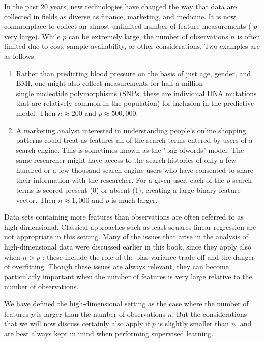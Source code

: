 \documentclass[10pt]{article}
\begin{document}
In the past 20 years, new technologies have changed the way that data are collected in fields as diverse as finance, marketing, and medicine. It is now commonplace to collect an almost unlimited number of feature measurements ( $p$ very large). While $p$ can be extremely large, the number of observations $n$ is often limited due to cost, sample availability, or other considerations. Two examples are as follows:

\begin{enumerate}
  \item Rather than predicting blood pressure on the basis of just age, gender, and BMI, one might also collect measurements for half a million\\
single nucleotide polymorphisms (SNPs; these are individual DNA mutations that are relatively common in the population) for inclusion in the predictive model. Then $n \approx 200$ and $p \approx 500,000$.
  \item A marketing analyst interested in understanding people's online shopping patterns could treat as features all of the search terms entered by users of a search engine. This is sometimes known as the "bag-ofwords" model. The same researcher might have access to the search histories of only a few hundred or a few thousand search engine users who have consented to share their information with the researcher. For a given user, each of the $p$ search terms is scored present (0) or absent (1), creating a large binary feature vector. Then $n \approx 1,000$ and $p$ is much larger.
\end{enumerate}

Data sets containing more features than observations are often referred to as high-dimensional. Classical approaches such as least squares linear regression are not appropriate in this setting. Many of the issues that arise in the analysis of high-dimensional data were discussed earlier in this book, since they apply also when $n>p$ : these include the role of the bias-variance trade-off and the danger of overfitting. Though these issues are always relevant, they can become particularly important when the number of features is very large relative to the number of observations.

We have defined the high-dimensional setting as the case where the number of features $p$ is larger than the number of observations $n$. But the considerations that we will now discuss certainly also apply if $p$ is slightly smaller than $n$, and are best always kept in mind when performing supervised learning.
\end{document}
